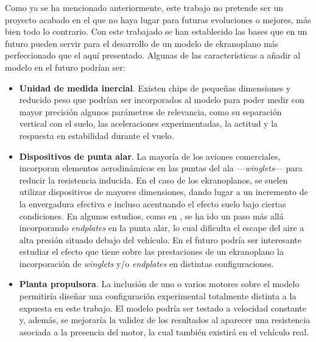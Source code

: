 Como ya se ha mencionado anteriormente, este trabajo no pretende ser un proyecto acabado en el que no haya lugar para futuras evoluciones o mejores, más bien todo lo contrario. Con este trabajado se han establecido las bases que en un futuro pueden servir para el desarrollo de un modelo de ekranoplano más perfeccionado que el aquí presentado. Algunas de las características a añadir al modelo en el futuro podrían ser:
\begin{itemize}
\item \textbf{Unidad de medida inercial}. Existen chips de pequeñas dimensiones y reducido peso que podrían ser incorporados al modelo para poder medir con mayor precisión algunos parámetros de relevancia, como su separación vertical con el suelo, las aceleraciones experimentadas, la actitud y la respuesta en estabilidad durante el vuelo.
\item \textbf{Dispositivos de punta alar}. La mayoría de los aviones comerciales, incorporan elementos aerodinámicos en las puntas del ala —\emph{winglets}— para reducir la resistencia inducida. En el caso de los ekranoplanos, se suelen utilizar dispositivos de mayores dimensiones, dando lugar a un incremento de la envergadura efectiva e incluso acentuando el efecto suelo bajo ciertas condiciones. En algunos estudios, como en \cite{ref:endplates}, se ha ido un paso más allá incorporando \emph{endplates} en la punta alar, lo cual dificulta el escape del aire a alta presión situado debajo del vehículo. En el futuro podría ser interesante estudiar el efecto que tiene sobre las prestaciones de un ekranoplano la incorporación de \emph{winglets} y/o \emph{endplates} en distintas configuraciones.
\item \textbf{Planta propulsora}. La inclusión de uno o varios motores sobre el modelo permitiría diseñar una configuración experimental totalmente distinta a la expuesta en este trabajo. El modelo podría ser testado a velocidad constante y, además, se mejoraría la validez de los resultados al aparecer una resistencia asociada a la presencia del motor, la cual también existirá en el vehículo real.
\end{itemize}

